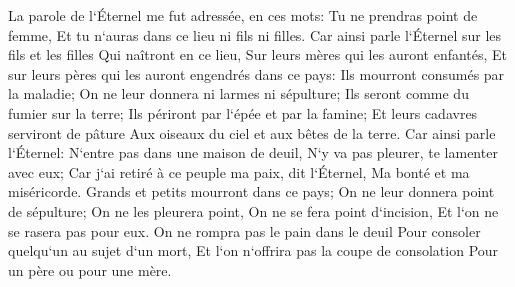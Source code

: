 \verse La parole de l`Éternel me fut adressée, en ces mots: 
\verse Tu ne prendras point de femme, Et tu n`auras dans ce lieu ni fils ni filles. 
\verse Car ainsi parle l`Éternel sur les fils et les filles Qui naîtront en ce lieu, Sur leurs mères qui les auront enfantés, Et sur leurs pères qui les auront engendrés dans ce pays: 
\verse Ils mourront consumés par la maladie; On ne leur donnera ni larmes ni sépulture; Ils seront comme du fumier sur la terre; Ils périront par l`épée et par la famine; Et leurs cadavres serviront de pâture Aux oiseaux du ciel et aux bêtes de la terre. 
\verse Car ainsi parle l`Éternel: N`entre pas dans une maison de deuil, N`y va pas pleurer, te lamenter avec eux; Car j`ai retiré à ce peuple ma paix, dit l`Éternel, Ma bonté et ma miséricorde. 
\verse Grands et petits mourront dans ce pays; On ne leur donnera point de sépulture; On ne les pleurera point, On ne se fera point d`incision, Et l`on ne se rasera pas pour eux. 
\verse On ne rompra pas le pain dans le deuil Pour consoler quelqu`un au sujet d`un mort, Et l`on n`offrira pas la coupe de consolation Pour un père ou pour une mère. 
